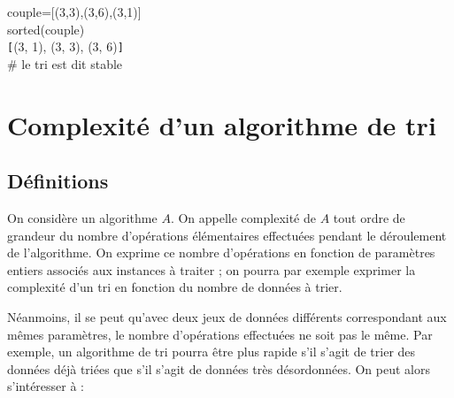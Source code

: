 \documentclass[t,11pt]{article}
\begin{document}
\begin{pythonshell}
\invite couple=[(3,3),(3,6),(3,1)]\\
\invite sorted(couple)\\
\verb![!(3, 1), (3, 3), (3, 6)\verb!]!\\
\# le tri est dit stable
\end{pythonshell}


\newpage
\section{Complexité d'un algorithme de tri}
\subsection{Définitions}



\begin{comp}
On considère un algorithme $A$. On appelle complexité de $A$ tout ordre de grandeur du
nombre d'opérations élémentaires effectuées pendant le déroulement de l'algorithme. On
exprime ce nombre d'opérations en fonction de paramètres entiers associés aux instances à
traiter ; on pourra par exemple exprimer la complexité d’un tri en fonction du nombre de
données à trier. 
\end{comp}

\noindent
Néanmoins, il se peut qu’avec deux jeux de données différents correspondant
aux mêmes paramètres, le nombre d’opérations effectuées ne soit pas le même. Par exemple,
un algorithme de tri pourra être plus rapide s’il s’agit de trier des données déjà triées que s’il
s’agit de données très désordonnées. On peut alors s’intéresser à :
\end{document}
